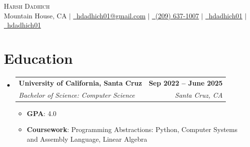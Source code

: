 \documentclass[letterpaper,11pt]{article}
\makeatletter
\newcommand{\resumeSubheading}[4]{
  \vspace{-2pt}\item
    \begin{tabular*}{1.0\textwidth}[t]{l@{\extracolsep{\fill}}r}
      \textbf{#1} & \textbf{\small #2} \\
      \textit{\small#3} & \textit{\small #4} \\
    \end{tabular*}\vspace{-7pt}
}
\newcommand{\resumeSubHeadingListStart}{\begin{itemize}[leftmargin=0.0in, label={}]}
\newcommand{\resumeSubHeadingListEnd}{\end{itemize}}
\makeatother
\begin{document}

\begin{center}
	{\Huge \scshape Harsh Dadhich} \\ \vspace{1pt}
	Mountain House, CA $|$ \color[HTML]{0000EE}\href{mailto:hdadhich01@gmail.com}{\faEnvelope~{hdadhich01@gmail.com}} \textcolor{black}{$|$} \color[HTML]{0000EE}\href{tel:+12096371007}{\small \raisebox{-0.1\height}\faPhone~{(209) 637-1007}} \textcolor{black}{$|$} \color[HTML]{0000EE}\href{https://www.linkedin.com/in/hdadhich01/}{\faLinkedin~{hdadhich01}} \textcolor{black}{$|$} \color[HTML]{0000EE}\href{https://github.com/hdadhich01}{\faGithub~{hdadhich01}}
	\vspace{-15pt}
\end{center}

\section{Education}
\resumeSubHeadingListStart

\resumeSubheading
{University of California, Santa Cruz}{Sep 2022 -- June 2025}
{Bachelor of Science: Computer Science}{Santa Cruz, CA}
\begin{itemize}[itemsep=-1pt, parsep=1pt]
	\item\small \textbf{GPA}{: 4.0}
	\item \textbf{Coursework}{: Programming Abstractions: Python, Computer Systems and Assembly Language, Linear Algebra}
\end{itemize}

\resumeSubHeadingListEnd
\vspace{-15pt}
\end{document}
